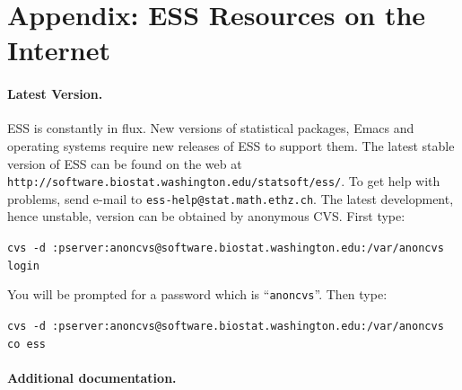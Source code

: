 \documentclass{article}
\def\url#1{\stexttt{#1}} %
\newcommand*{\SAS}{\textsc{SAS}}
\newcommand{\stexttt}[1]{{\small\texttt{#1}}}
\newenvironment{Comment}{\begin{quote}\small\itshape }{\end{quote}}
\begin{document}







\clearpage

\appendix
\section{Appendix: ESS Resources on the Internet}
\label{sec:access}

\paragraph{Latest Version.}

ESS is constantly in flux.  New versions of statistical
packages, Emacs and operating systems require new releases of ESS to
support them.  The latest stable version of ESS can be found on the web at
\url{http://software.biostat.washington.edu/statsoft/ess/}.  To get help
with problems, send e-mail to \url{ess-help@stat.math.ethz.ch}.
The latest development, hence unstable, version can be obtained by
anonymous CVS.  First type:

\stexttt{cvs -d
  :pserver:anoncvs@software.biostat.washington.edu:/var/anoncvs login}

You will be prompted for a password which is ``\stexttt{anoncvs}''.
Then type:

\stexttt{cvs -d
  :pserver:anoncvs@software.biostat.washington.edu:/var/anoncvs co
  ess}

\paragraph{Additional documentation.}
\end{document}
